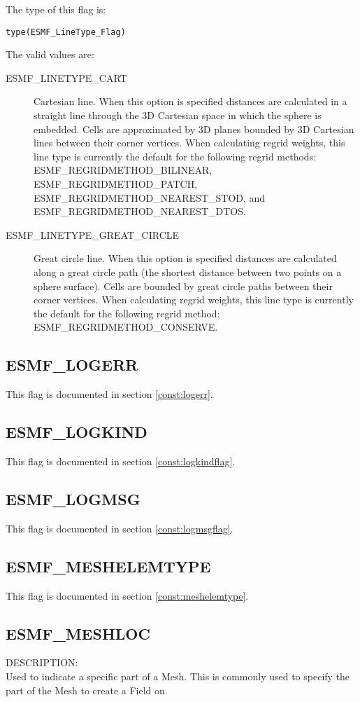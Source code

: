 The type of this flag is:

{\tt type(ESMF\_LineType\_Flag)}

The valid values are:
 \begin{description}
\item [ESMF\_LINETYPE\_CART]
   Cartesian line. When this option is specified distances are calculated in a straight line through the 3D Cartesian space
   in which the sphere is embedded. Cells are approximated by 3D planes bounded by 3D Cartesian lines between their corner vertices. 
   When calculating regrid weights, this line type is currently the default for the following regrid methods: ESMF\_REGRIDMETHOD\_BILINEAR, 
   ESMF\_REGRIDMETHOD\_PATCH, ESMF\_REGRIDMETHOD\_NEAREST\_STOD, and  ESMF\_REGRIDMETHOD\_NEAREST\_DTOS.
\item [ESMF\_LINETYPE\_GREAT\_CIRCLE]
   Great circle line. When this option is specified distances are calculated along a great circle path (the shortest distance
   between two points on a sphere surface). Cells are bounded by great circle paths between their corner vertices. When calculating regrid 
   weights, this line type is currently the default for the following regrid method: ESMF\_REGRIDMETHOD\_CONSERVE. 
\end{description}


\subsection{ESMF\_LOGERR}
This flag is documented in section \ref{const:logerr}.

\subsection{ESMF\_LOGKIND}
This flag is documented in section \ref{const:logkindflag}.

\subsection{ESMF\_LOGMSG}
This flag is documented in section \ref{const:logmsgflag}.

\subsection{ESMF\_MESHELEMTYPE}
This flag is documented in section \ref{const:meshelemtype}.

\subsection{ESMF\_MESHLOC}
\label{const:meshloc}
{\sf DESCRIPTION:\\}  
Used to indicate a specific part of a Mesh. This is commonly used to specify the part of the Mesh to
create a Field on. 

